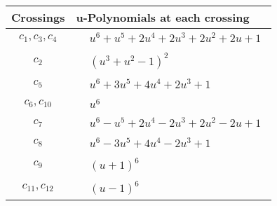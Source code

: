 \documentclass[1p]{elsarticle_modified}
\theoremstyle{definition}
\begin{document}
\begin{tabular}{m{50pt}|m{274pt}}
Crossings & \hspace{64pt}u-Polynomials at each crossing \\
\hline $$\begin{aligned}c_{1},c_{3},c_{4}\end{aligned}$$&$\begin{aligned}
&u^6+u^5+2 u^4+2 u^3+2 u^2+2 u+1
\end{aligned}$\\
\hline $$\begin{aligned}c_{2}\end{aligned}$$&$\begin{aligned}
&(u^3+u^2-1)^2
\end{aligned}$\\
\hline $$\begin{aligned}c_{5}\end{aligned}$$&$\begin{aligned}
&u^6+3 u^5+4 u^4+2 u^3+1
\end{aligned}$\\
\hline $$\begin{aligned}c_{6},c_{10}\end{aligned}$$&$\begin{aligned}
&u^6
\end{aligned}$\\
\hline $$\begin{aligned}c_{7}\end{aligned}$$&$\begin{aligned}
&u^6- u^5+2 u^4-2 u^3+2 u^2-2 u+1
\end{aligned}$\\
\hline $$\begin{aligned}c_{8}\end{aligned}$$&$\begin{aligned}
&u^6-3 u^5+4 u^4-2 u^3+1
\end{aligned}$\\
\hline $$\begin{aligned}c_{9}\end{aligned}$$&$\begin{aligned}
&(u+1)^6
\end{aligned}$\\
\hline $$\begin{aligned}c_{11},c_{12}\end{aligned}$$&$\begin{aligned}
&(u-1)^6
\end{aligned}$\\
\hline
\end{tabular}\\~\\
\end{document}
